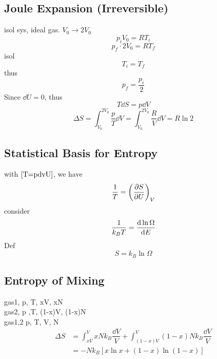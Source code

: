 \documentclass[UTF8]{ctexart} %
\DeclareMathOperator{\ra}{\rightarrow}
\newcommand{\txra}{\textrightarrow}
\numberwithin{equation}{subsection}
\begin{document}
\subsection{Joule Expansion (Irreversible)}
isol sys, ideal gas. $V_0 \ra 2V_0$
\begin{equation}\label{key}
p_i V_0 = RT_i
\end{equation}
\begin{equation}\label{key}
p_f\cdot 2V_0 = RT_f
\end{equation}
isol \txra
\begin{equation}\label{key}
T_i = T_f
\end{equation}
thus
\begin{equation}\label{key}
p_f = \dfrac{p_i}{2}
\end{equation}
Since $\dd U = 0$, thus
\begin{equation}\label{key}
T\dd S = p\dd V
\end{equation}
\begin{equation}\label{key}
\Delta S = \int_{V_0}^{2V_0}\dfrac{p}{T}\dd V = \int_{V_0}^{2V_0}\dfrac{R}{V}\dd V = R\ln 2
\end{equation}

\subsection{Statistical Basis for Entropy}
with $\eqref{T=pdvU}$, we have
\begin{equation}\label{key}
\dfrac{1}{T} = \qty(\pdv{S}{U})_V
\end{equation}
consider
\begin{equation}\label{key}
\dfrac{1}{k_B T} = \dv{\ln\Omega}{E}
\end{equation}
Def
\begin{equation}\label{key}
S = k_B \ln\Omega
\end{equation}

\subsection{Entropy of Mixing}
gas1, p, T, xV, xN\\
gas2, p ,T, (1-x)V, (1-x)N\\
\txra gas1,2 p, T, V, N
\begin{equation}\label{key}
\begin{aligned}
\Delta S &= \int_{xV}^V xNk_B\dfrac{\dd V}{V} + \int_{(1-x)V}^V (1-x)Nk_B\dfrac{\dd V}{V}\\
&=-Nk_B[x\ln x + (1-x)\ln(1-x)]
\end{aligned}
\end{equation}
\end{document}

